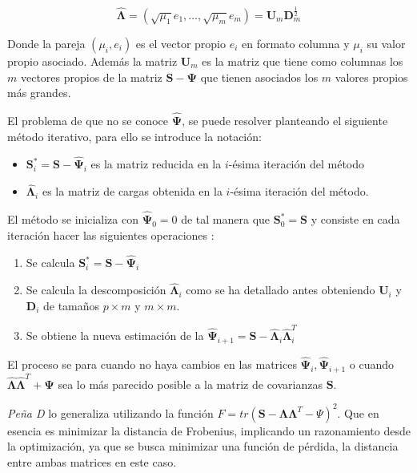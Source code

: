 \begin{equation}
\mathbf{\hat{\Lambda}}=(\sqrt{\mu_1}e_1,\ldots,\sqrt{\mu_m}e_m)=\mathbf{U}_m\mathbf{D}_m^{\frac{1}{2}}
\end{equation}

\noindent Donde la pareja $(\mu_i, e_i)$ es el vector propio $e_i$ en formato columna y $\mu_i$ su valor propio asociado. Además la matriz $\mathbf{U}_m$ es la matriz que tiene como columnas los $m$ vectores propios de la matriz $\mathbf{S}-\mathbf{\Psi}$ que tienen asociados los $m$ valores propios más grandes. 

\noindent El problema de que no se conoce $\mathbf{\hat{\Psi}}$, se puede resolver planteando el siguiente método iterativo, para ello se introduce la notación:
\begin{itemize}
\item $\mathbf{S}_i^*=\mathbf{S}-\hat{\mathbf{\Psi}}_i$ es la matriz reducida en la $i$-ésima iteración del método
\item $\mathbf{\hat{\Lambda}}_i$ es la matriz de cargas obtenida en la $i$-ésima iteración del método. 
\end{itemize}
\noindent El método se inicializa con $\mathbf{\hat{\Psi}}_0=0$ de tal manera que $\mathbf{S}_0^*=\mathbf{S}$ y consiste en cada iteración hacer las siguientes operaciones \cite{Johnson 2007, Peña 2002, Cuadras 2014}: 
\begin{enumerate}
\item Se calcula $\mathbf{S}_i^*=\mathbf{S-\hat{\Psi}}_i$
\item Se calcula la descomposición $\mathbf{\hat{\Lambda}}_i$ como se ha detallado antes obteniendo $\mathbf{U}_i$ y $\mathbf{D}_i$ de tamaños $p\times m $ y $m\times m$. 
\item Se obtiene la nueva estimación de la $\mathbf{\hat{\Psi}}_{i+1}=\mathbf{S}-\mathbf{\hat{\Lambda}}_i\mathbf{\hat{\Lambda}}_i^T$
\end{enumerate}

\noindent El proceso se para cuando no haya cambios en las matrices $\mathbf{\hat{\Psi}}_i,\mathbf{\hat{\Psi}}_{i+1}$ o cuando $\mathbf{\hat{\Lambda}}\mathbf{\hat{\Lambda}}^T+\mathbf{\Psi}$ sea lo más parecido posible a la matriz de covarianzas $\mathbf{S}$.

\noindent \emph{Peña D} \cite{Peña 2002} lo generaliza utilizando la función $F=tr(\mathbf{S}-\mathbf{\Lambda}\mathbf{\Lambda}^T-\Psi)^2$. Que en esencia es minimizar la distancia de Frobenius, implicando un razonamiento desde la optimización, ya que se busca minimizar  una función de pérdida, la distancia entre ambas matrices en este caso. 

